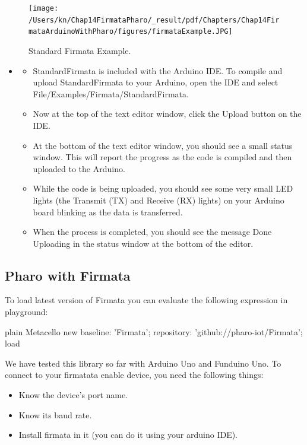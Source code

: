 \documentclass[10pt,twoside,english]{_support/latex/sbabook/sbabook}
\begin{document}
\begin{figure}

\begin{center}
\texttt{[image: /Users/kn/Chap14FirmataPharo/\_result/pdf/Chapters/Chap14FirmataArduinoWithPharo/figures/firmataExample.JPG]}\caption{Standard Firmata Example.\label{StandarFirmataExample}}\end{center}
\end{figure}


\begin{itemize}
\item 
\begin{itemize}
\item StandardFirmata is included with the Arduino IDE. To compile and upload StandardFirmata to your Arduino, open the IDE and select File/Examples/Firmata/StandardFirmata. 
\item Now at the top of the text editor window, click the Upload button on the IDE.
\item At the bottom of the text editor window, you should see a small status window. This will report the progress as the code is compiled and then uploaded to the Arduino. 
\item While the code is being uploaded, you should see some very small LED lights (the Transmit (TX) and Receive (RX) lights) on your Arduino board blinking as the data is transferred.
\item When the process is completed, you should see the message Done Uploading in the status window at the bottom of the editor.
\end{itemize}

\end{itemize}
\subsection{Pharo with Firmata}
To load latest version of Firmata you can evaluate the following expression in playground:

\begin{displaycode}{plain}
  Metacello new
  baseline: 'Firmata';
  repository: 'github://pharo-iot/Firmata';
  load
\end{displaycode}

We have tested this library so far with Arduino Uno and Funduino Uno. 
To connect to your firmatata enable device, you need the following things:

\begin{itemize}
\item Know the device's port name.
\item Know its baud rate.
\item Install firmata in it (you can do it using your arduino IDE).
\end{itemize}
\end{document}
